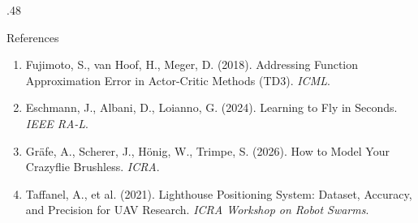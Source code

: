 \begin{frame}[t, fragile]
\begin{columns}[t]
\begin{column}{.48\textwidth}
    \begin{block}{References}
        \begin{enumerate}
            \item Fujimoto, S., van Hoof, H., Meger, D. (2018). Addressing Function Approximation Error in Actor-Critic Methods (TD3). \textit{ICML}.
            \item Eschmann, J., Albani, D., Loianno, G. (2024). Learning to Fly in Seconds. \textit{IEEE RA-L}.
            \item Gräfe, A., Scherer, J., Hönig, W., Trimpe, S. (2026). How to Model Your Crazyflie Brushless. \textit{ICRA}.
            \item Taffanel, A., et al. (2021). Lighthouse Positioning System: Dataset, Accuracy, and Precision for UAV Research. \textit{ICRA Workshop on Robot Swarms}.
        \end{enumerate}
    \end{block}

    \end{column}

\end{columns}

\end{frame}


